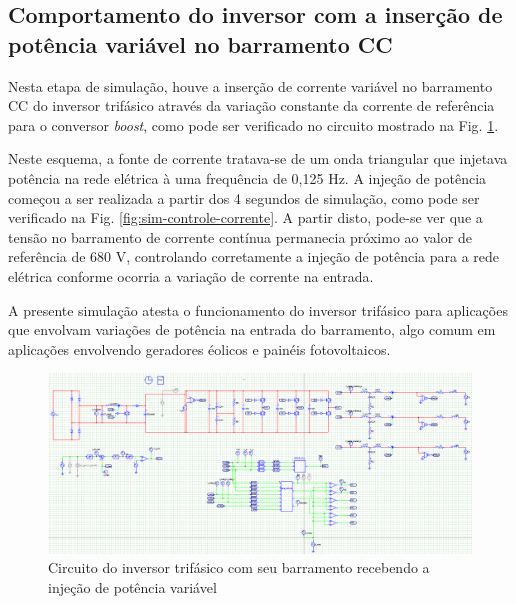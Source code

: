 \subsection{Comportamento do inversor com a inserção de potência variável no barramento CC}

Nesta etapa de simulação, houve a inserção de corrente variável no barramento CC do 
inversor trifásico através da variação constante da corrente de referência para o conversor 
\textit{boost}, como pode ser verificado no circuito mostrado na Fig. \ref{fig:sim-controle-corrente-esq}.

Neste esquema, a fonte de corrente tratava-se de um onda triangular que injetava potência 
na rede elétrica à uma frequência de 0,125 Hz. A injeção de potência começou a ser realizada 
a partir dos 4 segundos de simulação, como pode ser verificado na Fig. 
\ref{fig:sim-controle-corrente}. A partir disto, pode-se ver que a tensão no barramento de 
corrente contínua permanecia próximo ao valor de referência de 680 V, controlando corretamente
a injeção de potência para a rede elétrica conforme ocorria a variação de corrente na entrada.

A presente simulação atesta o funcionamento do inversor trifásico para aplicações que envolvam 
variações de potência na entrada do barramento, algo comum em aplicações envolvendo geradores 
éolicos e painéis fotovoltaicos.

\begin{figure}[!hbt]
	\begin{center}
    \includegraphics[width=\textwidth]{figuras/sim_figures/inversor_e_boost_variavel/esquematico.PNG}
    \caption{Circuito do inversor trifásico com seu barramento recebendo a injeção de potência variável}
    \label{fig:sim-controle-corrente-esq}
    \end{center}
\end{figure}

